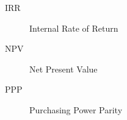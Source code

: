 

\renewcommand{\descriptionlabel}[1]{%
  \hspace\labelsep \upshape\bfseries #1:%
}

\begin{description}
  \item[IRR] Internal Rate of Return
  \item[NPV] Net Present Value
  \item[PPP] Purchasing Power Parity
\end{description}

\newpage
